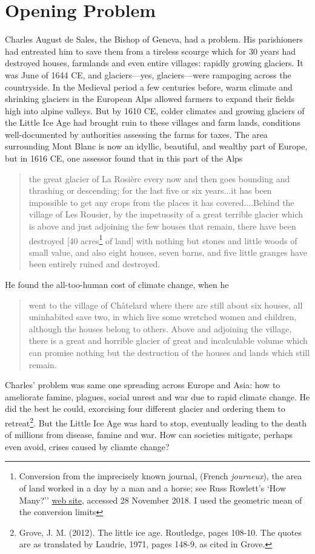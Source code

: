 \documentclass[amstex,12pt]{book}
\begin{document}
\section{Opening Problem}
Charles August de Sales, the Bishop of Geneva, had a problem. His parishioners had entreated him to save them from a tireless scourge which for 30 years had destroyed houses, farmlands and even entire villages: rapidly growing glaciers. It was June of 1644 CE, and glaciers---yes, glaciers---were rampaging across the countryside. In the Medieval period a few centuries before, warm climate and shrinking glaciers in the European Alps allowed farmers to expand their fields high into alpine valleys. But by 1610 CE, colder climates and growing glaciers of the Little Ice Age had brought ruin to these villages and farm lands, conditions well-documented by authorities assessing the farms for taxes. The area surrounding Mont Blanc is now an idyllic, beautiful, and wealthy part of Europe, but in 1616 CE, one assessor found that in this part of the Alps 
\begin{quotation}
the great glacier of La Rosi\`erc every now and then goes bounding and thrashing or descending; for the last five or six years...it has been impossible to get any crops from the places it has covered....Behind the village of Les Rousier, by the impetuosity of a great terrible glacier which is above and just adjoining the few houses that remain, there have been destroyed [40 acres\footnote{Conversion from the imprecisely known journal, (French \textit{journeux}), the area of land worked in a day by a man and a horse; see Russ Rowlett's `How Many?'' \href{http://www.ibiblio.org/units/dictJ.html}{web site}, accessed 28 November 2018. I used the geometric mean of the conversion limits} of land] with nothing but stones and little woods of small value, and also eight houses, seven barns, and five little granges have been entirely ruined and destroyed.
\end{quotation}
He found the all-too-human cost of climate change, when he
\begin{quotation} 
went to the village of Ch\^atelard where there are still about six houses, all uninhabited save two, in which live some wretched women and children, although the houses belong to others. Above and adjoining the village, there is a great and horrible glacier of great and incalculable volume which can promise nothing but the destruction of the houses and lands which still remain.
\end{quotation}
Charles' problem was same one spreading across Europe and Asia: how to ameliorate famine, plagues, social unrest and war due to rapid climate change. He did the best he could, exorcising four different glacier and ordering them to retreat\footnote{Grove, J. M. (2012). The little ice age. Routledge, pages 108-10. The quotes are as translated by Laudrie, 1971, pages 148-9, as cited in Grove.}. But the Little Ice Age was hard to stop, eventually leading to the death of millions from disease, famine and war. How can societies mitigate, perhaps even avoid, crises caused by cliamte change?
\end{document}
